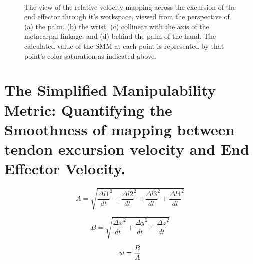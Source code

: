 \documentclass[letterpaper, 10 pt, conference]{ieeeconf}
\begin{document}
\begin{figure}
	 \hspace{3cm}   \\
	\caption{The view of the relative velocity mapping across the excursion of the end effector through it's workspace, viewed from the perspective of (a) the palm, (b) the wrist, (c) collinear with the axis of the metacarpal linkage, and (d) behind the palm of the hand. The calculated value of the SMM at each point is represented by that point's color saturation as indicated above.
	}\label{workspaces}
\end{figure}



\section{The Simplified Manipulability Metric: Quantifying the Smoothness of mapping between tendon excursion velocity and End Effector Velocity.}

\begin{equation}
A=\sqrt{{\frac{\Delta l1}{dt}}^{2}+{\frac{\Delta l2}{dt}}^{2}+{\frac{\Delta l3}{dt}}^{2}+{\frac{\Delta l4}{dt}}^{2}}
\end{equation}

\begin{equation}
B=\sqrt{{\frac{\Delta x}{dt}}^{2}+{\frac{\Delta y}{dt}}^{2}+{\frac{\Delta z}{dt}}^{2}}
\end{equation}

\begin{equation}
w=\frac{B}{A}
\vspace{10pt}
\end{equation}
\end{document}

